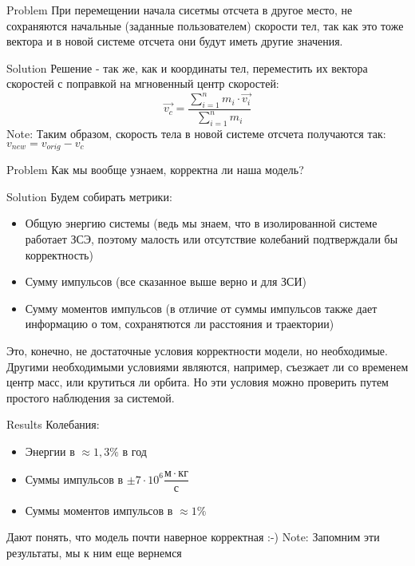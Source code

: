 \documentclass{beamer}
\begin{document}
\begin{frame}[fragile]{Problem}
  При перемещении начала сисетмы отсчета в другое место, не сохраняются начальные (заданные пользователем) скорости тел,
  так как это тоже вектора и в новой системе отсчета они будут иметь другие значения.
\end{frame}

\begin{frame}[fragile]{Solution}
  Решение - так же, как и координаты тел, переместить их вектора скоростей с поправкой на мгновенный центр скоростей:
  \[\overrightarrow{v_c} = \dfrac{\sum_{i = 1}^{n} m_i \cdot \overrightarrow{v_i}}{\sum_{i = 1}^{n} m_i}\]
  Note: Таким образом, скорость тела в новой системе отсчета получаются так: $v_{new} = v_{orig} - v_c$
\end{frame}

\begin{frame}[fragile]{Problem}
  Как мы вообще узнаем, корректна ли наша модель?
\end{frame}

\begin{frame}[fragile]{Solution}
  Будем собирать метрики:
  \begin{itemize}
    \item<2-> Общую энергию системы (ведь мы знаем, что в изолированной системе работает ЗСЭ, поэтому
    малость или отсутствие колебаний подтверждали бы корректность)
    \item<3-> Сумму импульсов (все сказанное выше верно и для ЗСИ)
    \item<4-> Сумму моментов импульсов (в отличие от суммы импульсов также дает информацию о том,
    сохранятются ли расстояния и траектории)
  \end{itemize}
  \pause[5]
  Это, конечно, не достаточные условия корректности модели, но необходимые.
  Другими необходимыми условиями являются, например, съезжает ли со временем центр масс, или
  крутиться ли орбита. Но эти условия можно проверить путем простого наблюдения за системой. 
\end{frame}

\begin{frame}[fragile]{Results}
  Колебания:
  \begin{itemize}
    \item<1-> Энергии в $\approx 1,3\%$ в год
    \item<2-> Суммы импульсов в $\pm 7 \cdot {10}^6 \dfrac{м \cdot кг}{с}$
    \item<3-> Суммы моментов импульсов в $\approx 1\%$
  \end{itemize}
  \pause[4]
  Дают понять, что модель почти наверное корректная :-)\newline
  Note: Запомним эти результаты, мы к ним еще вернемся
\end{frame}
\end{document}
